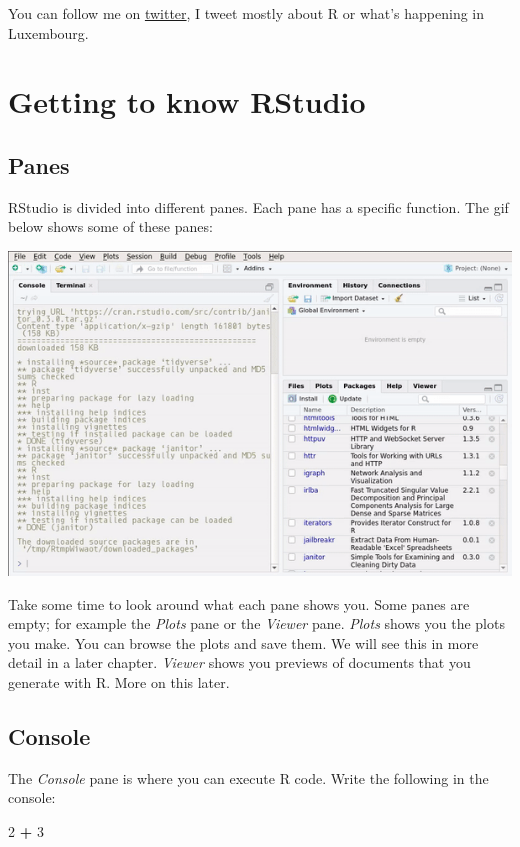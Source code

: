 \documentclass[]{gitbook}
\newenvironment{Shaded}{\begin{snugshade}}{\end{snugshade}}
\newcommand{\DecValTok}[1]{\textcolor[rgb]{0.00,0.00,0.81}{#1}}
\newcommand{\OperatorTok}[1]{\textcolor[rgb]{0.81,0.36,0.00}{\textbf{#1}}}
\newcommand{\StringTok}[1]{\textcolor[rgb]{0.31,0.60,0.02}{#1}}
\theoremstyle{definition}
\theoremstyle{definition}
\theoremstyle{definition}
\theoremstyle{remark}
\begin{document}
You can follow me on
\href{https://www.twitter.com/brodriguesco}{twitter}, I tweet mostly
about R or what's happening in Luxembourg.

\hypertarget{getting-to-know-rstudio}{%
\section{Getting to know RStudio}\label{getting-to-know-rstudio}}

\hypertarget{panes}{%
\subsection{Panes}\label{panes}}

RStudio is divided into different panes. Each pane has a specific
function. The gif below shows some of these panes:

\includegraphics{pics/rstudio_panes.gif}

Take some time to look around what each pane shows you. Some panes are
empty; for example the \emph{Plots} pane or the \emph{Viewer} pane.
\emph{Plots} shows you the plots you make. You can browse the plots and
save them. We will see this in more detail in a later chapter.
\emph{Viewer} shows you previews of documents that you generate with R.
More on this later.

\hypertarget{console}{%
\subsection{Console}\label{console}}

The \emph{Console} pane is where you can execute R code. Write the
following in the console:

\begin{Shaded}
\begin{Highlighting}[]
\DecValTok{2} \OperatorTok{+}\StringTok{ }\DecValTok{3}
\end{Highlighting}
\end{Shaded}
\end{document}
